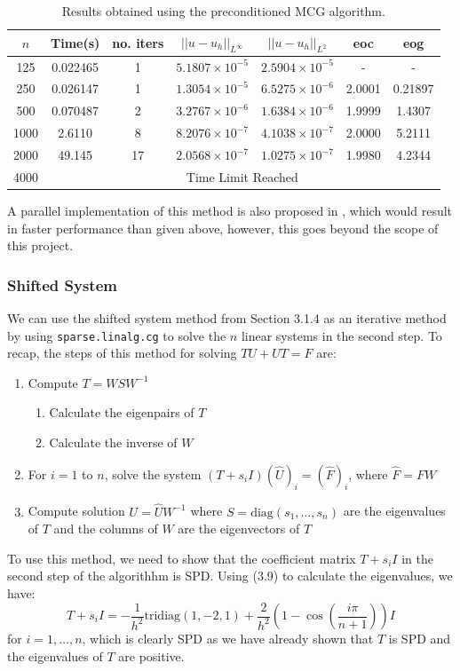 \documentclass[11pt]{article}
\numberwithin{equation}{section}
\begin{document}
\begin{table}[H]
\centering
\begin{tabular}{|c|c|c|c|c|c|c|}
\hline
$n$ & Time(s) & no. iters & $|| u - u_h ||_{L^{\infty}}$ &$|| u - u_h ||_{L^{2}}$ & eoc & eog \\
\hline
125 & 0.022465 & 1 & $5.1807 \times 10^{-5}$ & $2.5904 \times 10^{-5}$ & - & - \\
250 & 0.026147 & 1 & $1.3054 \times 10^{-5}$ & $6.5275 \times 10^{-6}$ & 2.0001 & 0.21897 \\
500 & 0.070487 & 2 & $3.2767 \times 10^{-6}$ & $1.6384 \times 10^{-6}$ & 1.9999 & 1.4307 \\
1000 & 2.6110 & 8 & $8.2076 \times 10^{-7}$ & $4.1038 \times 10^{-7}$ & 2.0000 & 5.2111 \\
2000 & 49.145 & 17 & $2.0568 \times 10^{-7}$ & $1.0275 \times 10^{-7}$ & 1.9980 & 4.2344 \\
\cline{2-7}
4000 & \multicolumn{6}{c|}{Time Limit Reached} \\
\hline
\end{tabular}
\captionsetup{justification=centering}
\caption{Results obtained using the preconditioned MCG algorithm.}
\label{table:pre MCG}
\end{table}

A parallel implementation of this method is also proposed in \cite{Hou}, which would result in faster performance than given above, however, this goes beyond the scope of this project.

\subsubsection{Shifted System}
We can use the shifted system method from Section 3.1.4 as an iterative method by using \texttt{sparse.linalg.cg} to solve the $n$ linear systems in the second step. To recap, the steps of this method for solving $TU+UT=F$ are:
\begin{enumerate}
\item Compute $T = WSW^{-1}$
	\begin{enumerate}
	\item Calculate the eigenpairs of $T$
	\item Calculate the inverse of $W$
	\end{enumerate}
\item For $i=1$ to $n$, solve the system $(T+s_i I)(\hat{U})_i = (\hat{F})_i$, where $\hat{F} = FW$
\item Compute solution $U = \hat{U}W^{-1}$
where $S = \text{diag}(s_1, \dots, s_n)$ are the eigenvalues of $T$ and the columns of $W$ are the eigenvectors of $T$
\end{enumerate}
To use this method, we need to show that the coefficient matrix $T+s_i I$ in the second step of the algorithhm is SPD. Using (3.9) to calculate the eigenvalues, we have:
\begin{equation} 
T+s_i I = -\frac{1}{h^2} \text{tridiag}(1,-2,1) + \frac{2}{h^2}\left(1 - \cos\left(\frac{i\pi}{n+1}\right)\right)I
\end{equation}
for $i=1,\dots,n$, which is clearly SPD as we have already shown that $T$ is SPD and the eigenvalues of $T$ are positive.
\end{document}
